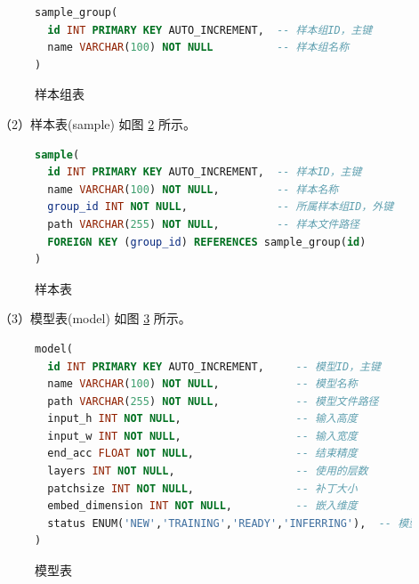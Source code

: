 \documentclass[
  ]{njuthesis}
\begin{document}
\begin{figure}[H]
    \centering
    \begin{minipage}{0.88\textwidth}
    {\linespread{1.2}
    \begin{lstlisting}[language=sql]
sample_group(
  id INT PRIMARY KEY AUTO_INCREMENT,  -- 样本组ID，主键
  name VARCHAR(100) NOT NULL          -- 样本组名称
)
    \end{lstlisting}}
    \end{minipage}
    \caption{样本组表}
    \label{样本组表}
\end{figure}

（2）样本表(sample) 如图 \ref{样本表} 所示。

\begin{figure}[H]
    \centering
    \begin{minipage}{0.88\textwidth}
    {\linespread{1.2}
    \begin{lstlisting}[language=sql]
sample(
  id INT PRIMARY KEY AUTO_INCREMENT,  -- 样本ID，主键
  name VARCHAR(100) NOT NULL,         -- 样本名称
  group_id INT NOT NULL,              -- 所属样本组ID，外键
  path VARCHAR(255) NOT NULL,         -- 样本文件路径
  FOREIGN KEY (group_id) REFERENCES sample_group(id)
)
    \end{lstlisting}}
    \end{minipage}
    \caption{样本表}
    \label{样本表}
\end{figure}

（3）模型表(model) 如图 \ref{模型表} 所示。

\begin{figure}[H]
    \centering
    \begin{minipage}{0.88\textwidth}
    {\linespread{1.2}
    \begin{lstlisting}[language=sql]
model(
  id INT PRIMARY KEY AUTO_INCREMENT,     -- 模型ID，主键
  name VARCHAR(100) NOT NULL,            -- 模型名称
  path VARCHAR(255) NOT NULL,            -- 模型文件路径
  input_h INT NOT NULL,                  -- 输入高度  
  input_w INT NOT NULL,                  -- 输入宽度
  end_acc FLOAT NOT NULL,                -- 结束精度
  layers INT NOT NULL,                   -- 使用的层数
  patchsize INT NOT NULL,                -- 补丁大小
  embed_dimension INT NOT NULL,          -- 嵌入维度
  status ENUM('NEW','TRAINING','READY','INFERRING'),  -- 模型状态
)
    \end{lstlisting}}
    \end{minipage}
    \caption{模型表}
    \label{模型表}
\end{figure}
\end{document}
